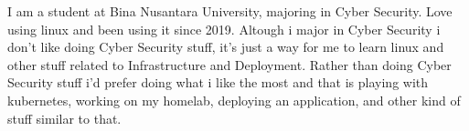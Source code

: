 \documentclass[9pt]{developercv} %
\begin{document}
\vspace{0.5cm}



\begin{minipage}[t]{0.4\textwidth} %
	\vspace{-\baselineskip} %
	
  I am a student at Bina Nusantara University, majoring in Cyber Security. Love
  using linux and been using it since 2019. Altough i major in Cyber Security i
  don’t like doing Cyber Security stuff, it’s just a way for me to learn linux
  and other stuff related to Infrastructure and Deployment. Rather than doing
  Cyber Security stuff i’d prefer doing what i like the most and that is playing
  with kubernetes, working on my homelab, deploying an application, and other
  kind of stuff similar to that.
\end{minipage}
\hfill %
\begin{minipage}[t]{0.5\textwidth} %
	\vspace{-\baselineskip} %
	\begin{barchart}{5.5}
	\end{barchart}
\end{minipage}

\begin{center}
\end{center}


\end{document}
